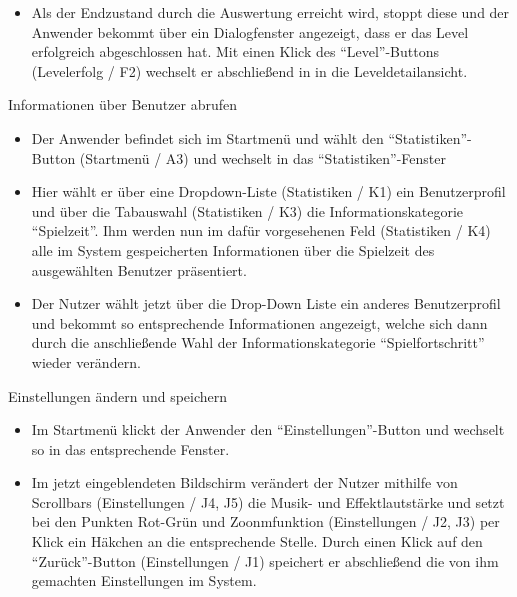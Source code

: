 \begin{requirements}
\begin{itemize}
  			\item Als der Endzustand durch die Auswertung erreicht wird, stoppt diese und der Anwender bekommt über ein Dialogfenster angezeigt, dass er das Level erfolgreich abgeschlossen hat. Mit einen Klick des "`Level"'-Buttons (Levelerfolg / F2) wechselt er abschließend in in die Leveldetailansicht.
  			
  			
  	\end{itemize}
  			

  	
  	 Informationen über Benutzer abrufen
  	
  	
  	\begin{itemize}
  	
		\item Der Anwender befindet sich im Startmenü und wählt den "`Statistiken"'-Button (Startmenü / A3) und wechselt in das "`Statistiken"'-Fenster
		
		\item Hier wählt er über eine Dropdown-Liste (Statistiken / K1) ein Benutzerprofil und über die Tabauswahl (Statistiken / K3) die Informationskategorie "`Spielzeit"'. Ihm werden nun im dafür vorgesehenen Feld (Statistiken / K4) alle im System gespeicherten Informationen über die Spielzeit des ausgewählten Benutzer präsentiert.
		
		\item Der Nutzer wählt jetzt über die Drop-Down Liste ein anderes Benutzerprofil und bekommt so entsprechende Informationen angezeigt, welche sich dann durch die anschließende Wahl der Informationskategorie "`Spielfortschritt"' wieder verändern.
		
  	
  	\end{itemize}
  	
  	
  	
  	 Einstellungen ändern und speichern
  	
  	
  	\begin{itemize}
  	
		\item Im Startmenü klickt der Anwender den "`Einstellungen"'-Button und wechselt so in das entsprechende Fenster.
		
		\item Im jetzt eingeblendeten Bildschirm verändert der Nutzer mithilfe von Scrollbars (Einstellungen / J4, J5) die Musik- und Effektlautstärke und setzt bei den Punkten Rot-Grün und Zoonmfunktion (Einstellungen / J2, J3) per Klick ein Häkchen an die entsprechende Stelle. Durch einen Klick auf den "`Zurück"'-Button (Einstellungen / J1) speichert er abschließend die von ihm gemachten Einstellungen im System.
  	
  	\end{itemize}
  	
  	
\end{requirements}
  		
